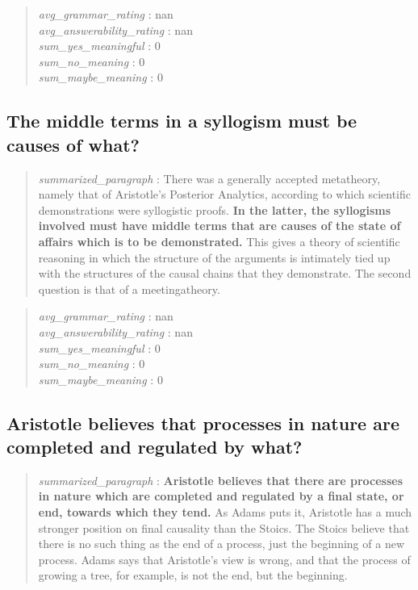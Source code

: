\begin{quote}
\emph{avg\_grammar\_rating} : nan\\
\emph{avg\_answerability\_rating} : nan\\
\emph{sum\_yes\_meaningful} : 0\\
\emph{sum\_no\_meaning} : 0\\
\emph{sum\_maybe\_meaning} : 0
\end{quote}

\hypertarget{the-middle-terms-in-a-syllogism-must-be-causes-of-what}{%
\subsection{The middle terms in a syllogism must be causes of
what?}\label{the-middle-terms-in-a-syllogism-must-be-causes-of-what}}

\begin{quote}
\emph{summarized\_paragraph} : There was a generally accepted
metatheory, namely that of Aristotle's Posterior Analytics, according to
which scientific demonstrations were syllogistic proofs. \textbf{In the
latter, the syllogisms involved must have middle terms that are causes
of the state of affairs which is to be demonstrated.} This gives a
theory of scientific reasoning in which the structure of the arguments
is intimately tied up with the structures of the causal chains that they
demonstrate. The second question is that of a meetingatheory.
\end{quote}

\begin{quote}
\emph{avg\_grammar\_rating} : nan\\
\emph{avg\_answerability\_rating} : nan\\
\emph{sum\_yes\_meaningful} : 0\\
\emph{sum\_no\_meaning} : 0\\
\emph{sum\_maybe\_meaning} : 0
\end{quote}

\hypertarget{aristotle-believes-that-processes-in-nature-are-completed-and-regulated-by-what}{%
\subsection{Aristotle believes that processes in nature are completed
and regulated by
what?}\label{aristotle-believes-that-processes-in-nature-are-completed-and-regulated-by-what}}

\begin{quote}
\emph{summarized\_paragraph} : \textbf{Aristotle believes that there are
processes in nature which are completed and regulated by a final state,
or end, towards which they tend.} As Adams puts it, Aristotle has a much
stronger position on final causality than the Stoics. The Stoics believe
that there is no such thing as the end of a process, just the beginning
of a new process. Adams says that Aristotle's view is wrong, and that
the process of growing a tree, for example, is not the end, but the
beginning.
\end{quote}

